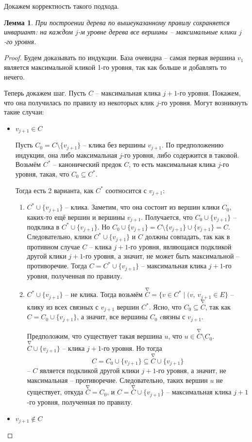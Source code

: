 \documentclass[a4paper,12pt]{article}
\newtheorem*{lemma}{Лемма}
\begin{document}
Докажем корректность такого подхода.
\begin{lemma}
При построении дерева по вышеуказанному правилу сохраняется инвариант: на каждом $j$-м уровне дерева все вершины -- максимальные клики $j$-го уровня.
\end{lemma}
\begin{proof}
    Будем доказывать по индукции. База очевидна -- самая первая вершина $v_1$ является максимальной кликой 1-го уровня, так как больше и добавлять то нечего.
    
    Теперь докажем шаг. Пусть $C$ -- максимальная клика $j + 1$-го уровня. Покажем, что она получилась по правилу из некоторых клик $j$-го уровня. Могут возникнуть такие случаи:
    \begin{itemize}
        \item $v_{j + 1} \in C$
        
        Пусть $C_0 = C \setminus \{v_{j + 1}\}$ -- клика без вершины $v_{j + 1}$. По предположению индукции, она либо максимальная $j$-го уровня, либо содержится в таковой. Возьмём $C^*$ -- канонический предок $C$, то есть максимальная клика $j$-го уровня, такая, что $C_0 \subseteq C^*$.
        
        Тогда есть 2 варианта, как $C^*$ соотносится с  $v_{j + 1}$:
        \begin{enumerate}
            \item $C^* \cup \{v_{j + 1}\}$ -- клика. Заметим, что она состоит из вершин клики $C_0$, каких-то ещё вершин и вершины $v_{j + 1}$. Получается, что $C_0 \cup \{v_{j + 1}\}$ -- подклика в $C^* \cup \{v_{j + 1}\}$. Но $C_0 \cup \{v_{j + 1}\} =  C \setminus \{v_{j + 1}\} \cup \{v_{j + 1}\} = C$. Следовательно, клики $C^* \cup \{v_{j + 1}\}$ и $C$ должны совпадать, так как в противном случае $C$ -- клика $j+1$-го уровня, являющаяся подкликой другой клики $j+1$-го уровня, а значит, не может быть максимальной -- противоречие. Тогда $C = C^* \cup \{v_{j + 1}\}$ -- максимальная клика $j + 1$-го уровня, полученная по правилу.
            \item $C^* \cup \{v_{j + 1}\}$ -- не клика. Тогда возьмём $\overset{\nabla}{C} = \{v \in C^*\mid (v,\ v_{j + 1} \in E\}$ -- клику из всех связных с $v_{j + 1}$ вершин $C^*$. Ясно, что $C_0 \subseteq \overset{\nabla}{C}$, так как $C = C_0 \cup \{v_{j + 1}\}$, а значит, все вершины $C_0$ cвязны с $v_{j + 1}$. 
            
            Предположим, что существует такая вершина $u$, что $u \in  \overset{\nabla}{C}\setminus C_0$. $\overset{\nabla}{C} \cup \{v_{j + 1}\}$ -- клика $j + 1$-го уровня. Но тогда
            \[C = C_0 \cup \{v_{j + 1}\} \subseteq \overset{\nabla}{C} \cup \{v_{j + 1}\}\] -- $C$ является подкликой другой клики $j+1$-го уровня, а значит, не максимальная -- противоречие. Следовательно, таких вершин $u$ не существует, откуда $\overset{\nabla}{C} = C_0$, и $C = \overset{\nabla}{C} \cup \{v_{j + 1}\}$ -- максимальная клика $j + 1$-го уровня, полученная по правилу.
        \end{enumerate}
        \item $v_{j + 1} \notin C$
        

\end{itemize}
\end{proof}
\end{document}

